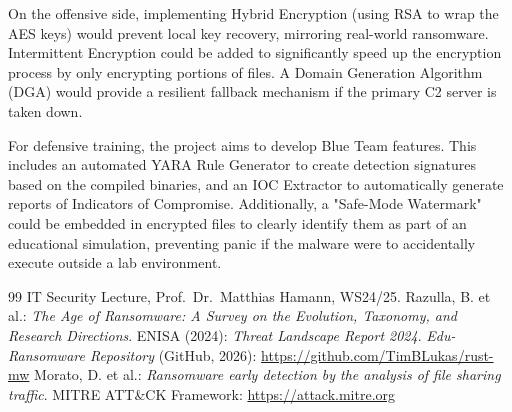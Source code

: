 \documentclass[12pt,a4paper]{article}
\begin{document}
On the offensive side, implementing Hybrid Encryption (using RSA to wrap the AES keys) would prevent local key recovery, mirroring real-world ransomware. Intermittent Encryption could be added to significantly speed up the encryption process by only encrypting portions of files. A Domain Generation Algorithm (DGA) would provide a resilient fallback mechanism if the primary C2 server is taken down.

For defensive training, the project aims to develop Blue Team features. This includes an automated YARA Rule Generator to create detection signatures based on the compiled binaries, and an IOC Extractor to automatically generate reports of Indicators of Compromise. Additionally, a "Safe-Mode Watermark" could be embedded in encrypted files to clearly identify them as part of an educational simulation, preventing panic if the malware were to accidentally execute outside a lab environment.

\begin{thebibliography}{99}
   IT Security Lecture, Prof.\ Dr.\ Matthias Hamann, WS24/25.
   Razulla, B. et al.: \textit{The Age of Ransomware: A Survey on the Evolution, Taxonomy, and Research Directions}.
   ENISA (2024): \textit{Threat Landscape Report 2024}.
   \textit{Edu-Ransomware Repository} (GitHub, 2026): \url{https://github.com/TimBLukas/rust-mw}
   Morato, D. et al.: \textit{Ransomware early detection by the analysis of file sharing traffic}.
   MITRE ATT\&CK Framework: \url{https://attack.mitre.org}
\end{thebibliography}
\end{document}
